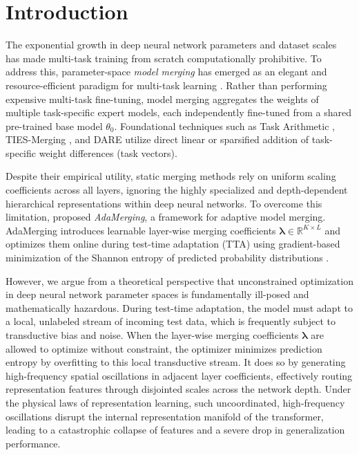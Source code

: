 \section{Introduction}
\label{sec:intro}

The exponential growth in deep neural network parameters and dataset scales has made multi-task training from scratch computationally prohibitive. To address this, parameter-space \emph{model merging} has emerged as an elegant and resource-efficient paradigm for multi-task learning \citep{ilharco2022editing, wortsman2022model}. Rather than performing expensive multi-task fine-tuning, model merging aggregates the weights of multiple task-specific expert models, each independently fine-tuned from a shared pre-trained base model $\theta_0$. Foundational techniques such as Task Arithmetic \citep{ilharco2022editing}, TIES-Merging \citep{yadav2023ties}, and DARE \citep{yu2023language} utilize direct linear or sparsified addition of task-specific weight differences (task vectors).

Despite their empirical utility, static merging methods rely on uniform scaling coefficients across all layers, ignoring the highly specialized and depth-dependent hierarchical representations within deep neural networks. To overcome this limitation, \citet{adamerging} proposed \emph{AdaMerging}, a framework for adaptive model merging. AdaMerging introduces learnable layer-wise merging coefficients $\boldsymbol{\lambda} \in \mathbb{R}^{K \times L}$ and optimizes them online during test-time adaptation (TTA) using gradient-based minimization of the Shannon entropy of predicted probability distributions \citep{wang2020tent, liao2021are}. 

However, we argue from a theoretical perspective that unconstrained optimization in deep neural network parameter spaces is fundamentally ill-posed and mathematically hazardous. During test-time adaptation, the model must adapt to a local, unlabeled stream of incoming test data, which is frequently subject to transductive bias and noise. When the layer-wise merging coefficients $\boldsymbol{\lambda}$ are allowed to optimize without constraint, the optimizer minimizes prediction entropy by overfitting to this local transductive stream. It does so by generating high-frequency spatial oscillations in adjacent layer coefficients, effectively routing representation features through disjointed scales across the network depth. Under the physical laws of representation learning, such uncoordinated, high-frequency oscillations disrupt the internal representation manifold of the transformer, leading to a catastrophic collapse of features and a severe drop in generalization performance. 

